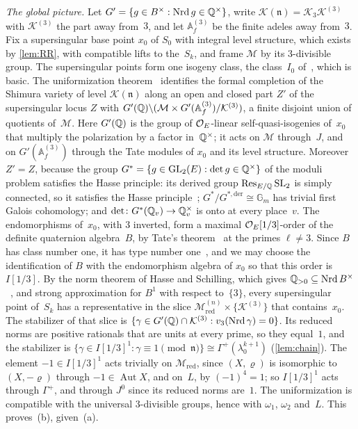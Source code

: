 \begin{informalproof}
\emph{The global picture.} Let $G'=\{g\in B^\times:\operatorname{Nrd} g\in\mathbb{Q}^\times\}$, write $\mathcal K(\mathfrak n)=\mathcal
K_3\mathcal K^{(3)}$ with $\mathcal K^{(3)}$ the part away from~$3$, and let $\mathbb A_f^{(3)}$ be the finite adeles away
from~$3$. Fix a supersingular base point $x_0$ of $S_0$ with integral level structure, which exists by \cref{lem:RR},
with compatible lifts to the~$S_k$, and frame $\mathcal M$ by its $3$-divisible group. The supersingular points form one
isogeny class, the class~$I_0$ of~\cite[Section~3]{KudlaRapoport1999}, which is basic. The uniformization
theorem~\cite[Theorem~6.30]{RapoportZink1996} identifies the formal completion of the Shimura variety of level
$\mathcal K(\mathfrak n)$ along an open and closed part $Z'$ of the supersingular locus $Z$ with
$G'(\mathbb{Q})\backslash(\mathcal M\times G'(\mathbb A_f^{(3)})/\mathcal K^{(3)})$, a finite disjoint union of quotients of~$\mathcal M$.
Here $G'(\mathbb{Q})$ is the group of $\mathcal{O}_E$-linear self-quasi-isogenies of~$x_0$ that multiply the polarization by a factor
in~$\mathbb{Q}^\times$; it acts on $\mathcal M$ through~$J$, and on $G'(\mathbb A_f^{(3)})$ through the Tate modules of $x_0$ and its
level structure. Moreover $Z'=Z$, because the group $G^*=\{g\in\operatorname{GL}_2(E):\det g\in\mathbb{Q}^\times\}$ of the moduli problem
satisfies the Hasse principle: its derived group $\operatorname{Res}_{E/\mathbb{Q}}\operatorname{SL}_2$ is simply connected, so it satisfies the
Hasse principle~\cite[Chapter~6]{PlatonovRapinchuk1994}; $G^*/G^{*,\mathrm{der}}\cong\mathbb G_m$ has trivial first Galois
cohomology; and $\det\colon G^*(\mathbb{Q}_v)\to\mathbb{Q}_v^\times$ is onto at every place~$v$. The endomorphisms of~$x_0$, with $3$
inverted, form a maximal $\mathcal{O}_E[1/3]$-order of the definite quaternion algebra~$B$, by Tate's theorem~\cite{Tate1966} at
the primes $\ell\ne3$. Since $B$ has class number one, it has type number one~\cite[Corollaire~I.4.11 and p.~155]{Vigneras1980},
and we may choose the identification of $B$ with the endomorphism algebra of $x_0$ so that this order is $I[1/3]$. By the norm theorem of Hasse and Schilling, which gives $\mathbb{Q}_{>0}\subseteq\operatorname{Nrd} B^\times$~\cite[Theorem~III.4.1]{Vigneras1980},
and strong approximation for $B^1$ with respect to~$\{3\}$, every supersingular point of~$S_k$ has a representative in the slice $\mathcal M^{(n)}_{\mathrm{red}}\times\{\mathcal K^{(3)}\}$ that contains~$x_0$. The
stabilizer of that slice is $\{\gamma\in G'(\mathbb{Q})\cap\mathcal K^{(3)}:v_3(\operatorname{Nrd}\gamma)=0\}$. Its reduced norms are positive
rationals that are units at every prime, so they equal~$1$, and the stabilizer is
$\{\gamma\in I[1/3]^1:\gamma\equiv1\pmod{\mathfrak n}\}\cong\Gamma^+(\lambda_0^{k+1})$ (\cref{lem:chain}). The element
$-1\in I[1/3]^1$ acts trivially on $\mathcal M_{\mathrm{red}}$, since $(X,\varrho)$ is isomorphic to $(X,-\varrho)$ through
$-1\in\operatorname{Aut}X$, and on~$L$, by $(-1)^4=1$; so $I[1/3]^1$ acts through $\Gamma^+$, and through $J^0$ since its
reduced norms are~$1$. The uniformization is compatible with the universal $3$-divisible groups, hence with $\omega_1$,
$\omega_2$ and~$L$. This proves~(b), given~(a).


\end{informalproof}
